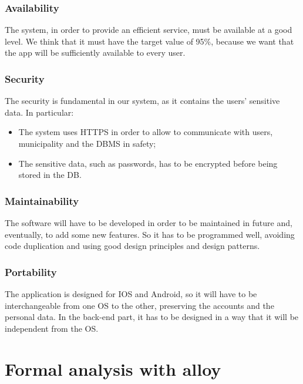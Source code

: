 \documentclass[titlepage]{article}
\begin{document}
\subsubsection{Availability}
The system, in order to provide an efficient service, must be available at a good level. We think that it must have the target value of 95\%, because we want that the app will be sufficiently available to every user.

\subsubsection{Security}
The security is fundamental in our system, as it contains the users' sensitive data. In particular:
\begin{itemize}
\item The system uses HTTPS in order to allow to communicate with users, municipality and the DBMS in safety;
\item The sensitive data, such as passwords, has to be encrypted before being stored in the DB.
\end{itemize}


\subsubsection{Maintainability}
The software will have to be developed in order to be maintained in future and, eventually, to add some new features.
So it has to be programmed well, avoiding code duplication and using good design principles and design patterns.

\subsubsection{Portability}

The application is designed for IOS and Android, so it will have to be interchangeable from one OS to the other, preserving the accounts and the personal data.
In the back-end part, it has to be designed in a way that it will be independent from the OS.


\section{Formal analysis with alloy}
\end{document}

